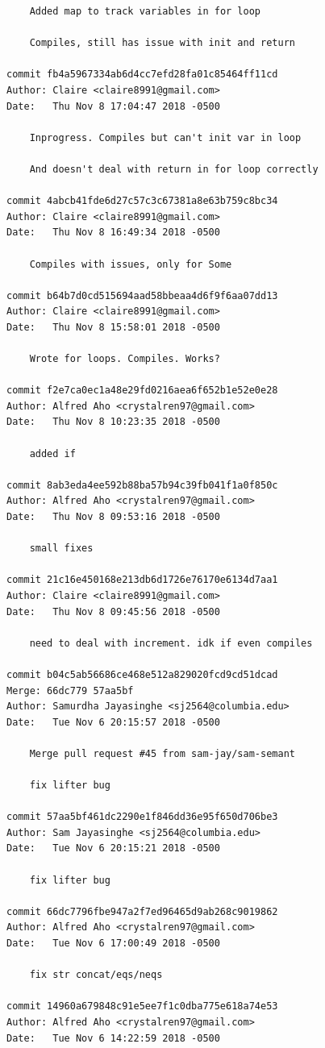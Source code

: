 \documentclass[12pt]{article}
\begin{document}
\begin{lstlisting}
    Added map to track variables in for loop
    
    Compiles, still has issue with init and return

commit fb4a5967334ab6d4cc7efd28fa01c85464ff11cd
Author: Claire <claire8991@gmail.com>
Date:   Thu Nov 8 17:04:47 2018 -0500

    Inprogress. Compiles but can't init var in loop
    
    And doesn't deal with return in for loop correctly

commit 4abcb41fde6d27c57c3c67381a8e63b759c8bc34
Author: Claire <claire8991@gmail.com>
Date:   Thu Nov 8 16:49:34 2018 -0500

    Compiles with issues, only for Some

commit b64b7d0cd515694aad58bbeaa4d6f9f6aa07dd13
Author: Claire <claire8991@gmail.com>
Date:   Thu Nov 8 15:58:01 2018 -0500

    Wrote for loops. Compiles. Works?

commit f2e7ca0ec1a48e29fd0216aea6f652b1e52e0e28
Author: Alfred Aho <crystalren97@gmail.com>
Date:   Thu Nov 8 10:23:35 2018 -0500

    added if

commit 8ab3eda4ee592b88ba57b94c39fb041f1a0f850c
Author: Alfred Aho <crystalren97@gmail.com>
Date:   Thu Nov 8 09:53:16 2018 -0500

    small fixes

commit 21c16e450168e213db6d1726e76170e6134d7aa1
Author: Claire <claire8991@gmail.com>
Date:   Thu Nov 8 09:45:56 2018 -0500

    need to deal with increment. idk if even compiles

commit b04c5ab56686ce468e512a829020fcd9cd51dcad
Merge: 66dc779 57aa5bf
Author: Samurdha Jayasinghe <sj2564@columbia.edu>
Date:   Tue Nov 6 20:15:57 2018 -0500

    Merge pull request #45 from sam-jay/sam-semant
    
    fix lifter bug

commit 57aa5bf461dc2290e1f846dd36e95f650d706be3
Author: Sam Jayasinghe <sj2564@columbia.edu>
Date:   Tue Nov 6 20:15:21 2018 -0500

    fix lifter bug

commit 66dc7796fbe947a2f7ed96465d9ab268c9019862
Author: Alfred Aho <crystalren97@gmail.com>
Date:   Tue Nov 6 17:00:49 2018 -0500

    fix str concat/eqs/neqs

commit 14960a679848c91e5ee7f1c0dba775e618a74e53
Author: Alfred Aho <crystalren97@gmail.com>
Date:   Tue Nov 6 14:22:59 2018 -0500


\end{lstlisting}
\end{document}
